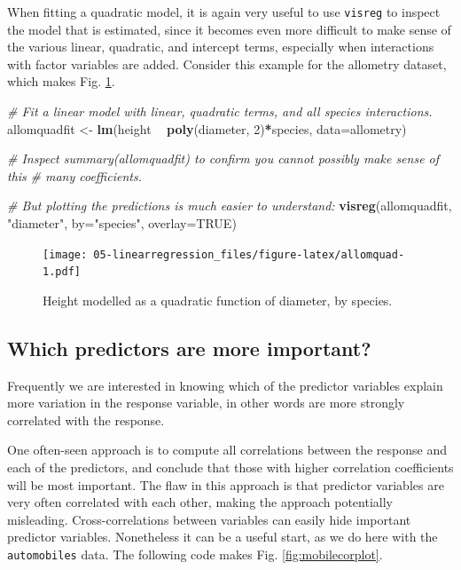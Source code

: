 \documentclass[]{book}
\newenvironment{Shaded}{\begin{snugshade}}{\end{snugshade}}
\newcommand{\CommentTok}[1]{\textcolor[rgb]{0.56,0.35,0.01}{\textit{#1}}}
\newcommand{\DataTypeTok}[1]{\textcolor[rgb]{0.13,0.29,0.53}{#1}}
\newcommand{\DecValTok}[1]{\textcolor[rgb]{0.00,0.00,0.81}{#1}}
\newcommand{\KeywordTok}[1]{\textcolor[rgb]{0.13,0.29,0.53}{\textbf{#1}}}
\newcommand{\NormalTok}[1]{#1}
\newcommand{\OperatorTok}[1]{\textcolor[rgb]{0.81,0.36,0.00}{\textbf{#1}}}
\newcommand{\OtherTok}[1]{\textcolor[rgb]{0.56,0.35,0.01}{#1}}
\newcommand{\StringTok}[1]{\textcolor[rgb]{0.31,0.60,0.02}{#1}}
\begin{document}
When fitting a quadratic model, it is again very useful to use \texttt{visreg} to inspect the model that is estimated, since it becomes even more difficult to make sense of the various linear, quadratic, and intercept terms, especially when interactions with factor variables are added. Consider this example for the allometry dataset, which makes Fig. \ref{fig:allomquad}.

\begin{Shaded}
\begin{Highlighting}[]
\CommentTok{# Fit a linear model with linear, quadratic terms, and all species interactions.}
\NormalTok{allomquadfit <-}\StringTok{ }\KeywordTok{lm}\NormalTok{(height }\OperatorTok{~}\StringTok{ }\KeywordTok{poly}\NormalTok{(diameter, }\DecValTok{2}\NormalTok{)}\OperatorTok{*}\NormalTok{species, }\DataTypeTok{data=}\NormalTok{allometry)}

\CommentTok{# Inspect summary(allomquadfit) to confirm you cannot possibly make sense of this}
\CommentTok{# many coefficients.}

\CommentTok{# But plotting the predictions is much easier to understand:}
\KeywordTok{visreg}\NormalTok{(allomquadfit, }\StringTok{"diameter"}\NormalTok{, }\DataTypeTok{by=}\StringTok{"species"}\NormalTok{, }\DataTypeTok{overlay=}\OtherTok{TRUE}\NormalTok{)}
\end{Highlighting}
\end{Shaded}

\begin{figure}
\centering
\texttt{[image: 05-linearregression\_files/figure-latex/allomquad-1.pdf]}
\caption{\label{fig:allomquad}Height modelled as a quadratic function of diameter, by species.}
\end{figure}

\hypertarget{importance}{%
\subsection{Which predictors are more important?}\label{importance}}

Frequently we are interested in knowing which of the predictor variables explain more variation in the response variable, in other words are more strongly correlated with the response.

One often-seen approach is to compute all correlations between the response and each of the predictors, and conclude that those with higher correlation coefficients will be most important. The flaw in this approach is that predictor variables are very often correlated with each other, making the approach potentially misleading. Cross-correlations between variables can easily hide important predictor variables. Nonetheless it can be a useful start, as we do here with the \texttt{automobiles} data. The following code makes Fig. \ref{fig:mobilecorplot}.
\end{document}
